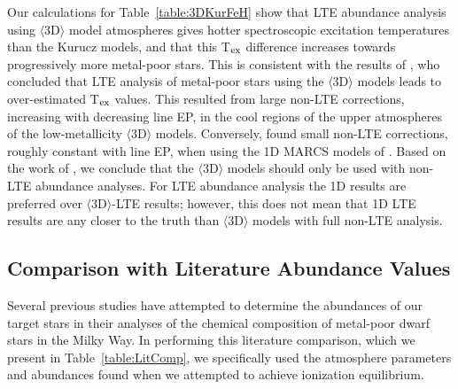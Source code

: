 \documentclass[revtex4]{emulateapj}
\begin{document}
Our calculations for Table~\ref{table:3DKurFeH} show that LTE abundance analysis using $\langle$3D$\rangle$ model atmospheres gives hotter spectroscopic excitation temperatures than the Kurucz models, and that this T$_{\rm ex}$ difference increases towards progressively more metal-poor stars.  This is consistent with the results of \citet{Berg2012}, who concluded that LTE analysis of metal-poor stars using the $\langle$3D$\rangle$ models leads to over-estimated T$_{\rm ex}$ values.  This resulted from large non-LTE corrections, increasing with decreasing line EP, in the cool regions of the upper atmospheres of the low-metallicity $\langle$3D$\rangle$ models.  Conversely, \citet{Berg2012} found small non-LTE corrections, roughly constant with line EP, when using the 1D MARCS models of \citet{Gust2008}.  Based on the work of \citet{Berg2012}, we conclude that the $\langle$3D$\rangle$ models should only be used with non-LTE abundance analyses.  For LTE abundance analysis the 1D results are preferred over $\langle$3D$\rangle$-LTE results; however, this does not mean that 1D LTE results are any closer to the truth than $\langle$3D$\rangle$ models with full non-LTE analysis.

\subsection{Comparison with Literature Abundance Values}
Several previous studies have attempted to determine the abundances of our target stars in their analyses of the chemical composition of metal-poor dwarf stars in the Milky Way.  In performing this literature comparison, which we present in Table~\ref{table:LitComp}, we specifically used the atmosphere parameters and abundances found when we attempted to achieve ionization equilibrium.
\end{document}

